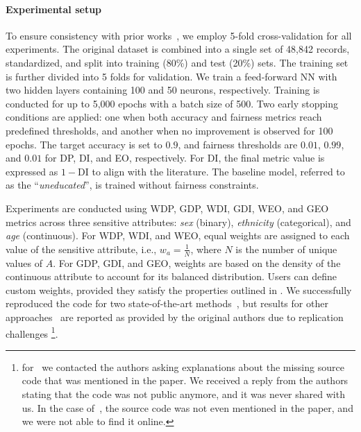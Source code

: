 \paragraph{Experimental setup}
\label{par:experimental-setup}
%
To ensure consistency with prior works~\cite{DBLP:conf/ijcai/ManishaG20,DBLP:conf/aaaiss/WagnerG21}, we employ 5-fold cross-validation for all experiments.
%
The original dataset is combined into a single set of 48,842 records, standardized, and split into training (80\%) and test (20\%) sets.
%
The training set is further divided into 5 folds for validation.
%
We train a feed-forward \gls{NN} with two hidden layers containing 100 and 50 neurons, respectively.
%
Training is conducted for up to 5,000 epochs with a batch size of 500.
%
Two early stopping conditions are applied: one when both accuracy and fairness metrics reach predefined thresholds, and another when no improvement is observed for 100 epochs.
%
The target accuracy is set to \(0.9\), and fairness thresholds are \(0.01\), \(0.99\), and \(0.01\) for \gls{DP}, \gls{DI}, and \gls{EO}, respectively.
%
For \gls{DI}, the final metric value is expressed as \(1 - \text{DI}\) to align with the literature.
%
The baseline model, referred to as the ``\emph{uneducated}'', is trained without fairness constraints.

%
Experiments are conducted using \gls{WDP}, \gls{GDP}, \gls{WDI}, \gls{GDI}, \gls{WEO}, and \gls{GEO} metrics across three sensitive attributes: \emph{sex} (binary), \emph{ethnicity} (categorical), and \emph{age} (continuous).
%
For \gls{WDP}, \gls{WDI}, and \gls{WEO}, equal weights are assigned to each value of the sensitive attribute, i.e., \(w_a = \frac{1}{N}\), where \(N\) is the number of unique values of \(A\).
%
For \gls{GDP}, \gls{GDI}, and \gls{GEO}, weights are based on the density of the continuous attribute to account for its balanced distribution.
%
Users can define custom weights, provided they satisfy the properties outlined in .
%
We successfully reproduced the code for two state-of-the-art methods~\cite{DBLP:conf/nips/ChoHS20,DBLP:conf/iclr/JiangHFYMH22}, but results for other approaches~\cite{DBLP:conf/ijcai/ManishaG20,DBLP:conf/aaaiss/WagnerG21} are reported as provided by the original authors due to replication challenges
%
\footnote{
    for~\cite{DBLP:conf/aaaiss/WagnerG21} we contacted the authors asking explanations about the missing source code that was mentioned in the paper.
    We received a reply from the authors stating that the code was not public anymore, and it was never shared with us.
    In the case of~\cite{DBLP:conf/ijcai/ManishaG20}, the source code was not even mentioned in the paper, and we were not able to find it online.
}.

